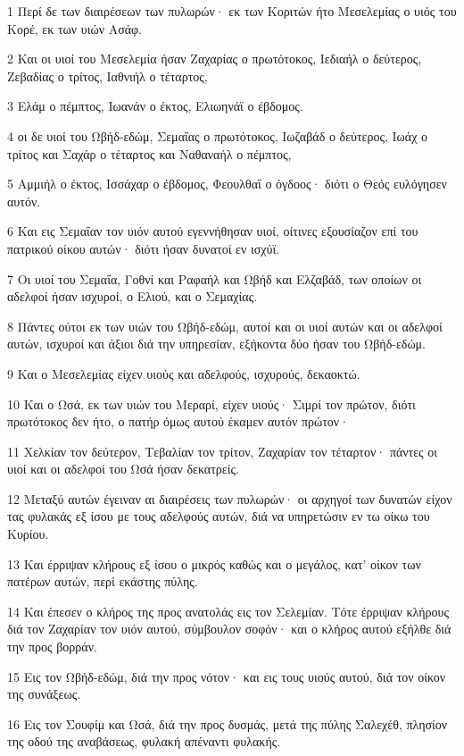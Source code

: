 \par 1 Περί δε των διαιρέσεων των πυλωρών· εκ των Κοριτών ήτο Μεσελεμίας ο υιός του Κορέ, εκ των υιών Ασάφ.
\par 2 Και οι υιοί του Μεσελεμία ήσαν Ζαχαρίας ο πρωτότοκος, Ιεδιαήλ ο δεύτερος, Ζεβαδίας ο τρίτος, Ιαθνιήλ ο τέταρτος,
\par 3 Ελάμ ο πέμπτος, Ιωανάν ο έκτος, Ελιωηνάϊ ο έβδομος.
\par 4 οι δε υιοί του Ωβήδ-εδώμ, Σεμαΐας ο πρωτότοκος, Ιωζαβάδ ο δεύτερος, Ιωάχ ο τρίτος και Σαχάρ ο τέταρτος και Ναθαναήλ ο πέμπτος,
\par 5 Αμμιήλ ο έκτος, Ισσάχαρ ο έβδομος, Φεουλθαΐ ο όγδοος· διότι ο Θεός ευλόγησεν αυτόν.
\par 6 Και εις Σεμαΐαν τον υιόν αυτού εγεννήθησαν υιοί, οίτινες εξουσίαζον επί του πατρικού οίκου αυτών· διότι ήσαν δυνατοί εν ισχύϊ.
\par 7 Οι υιοί του Σεμαΐα, Γοθνί και Ραφαήλ και Ωβήδ και Ελζαβάδ, των οποίων οι αδελφοί ήσαν ισχυροί, ο Ελιού, και ο Σεμαχίας.
\par 8 Πάντες ούτοι εκ των υιών του Ωβήδ-εδώμ, αυτοί και οι υιοί αυτών και οι αδελφοί αυτών, ισχυροί και άξιοι διά την υπηρεσίαν, εξήκοντα δύο ήσαν του Ωβήδ-εδώμ.
\par 9 Και ο Μεσελεμίας είχεν υιούς και αδελφούς, ισχυρούς, δεκαοκτώ.
\par 10 Και ο Ωσά, εκ των υιών του Μεραρί, είχεν υιούς· Σιμρί τον πρώτον, διότι πρωτότοκος δεν ήτο, ο πατήρ όμως αυτού έκαμεν αυτόν πρώτον·
\par 11 Χελκίαν τον δεύτερον, Τεβαλίαν τον τρίτον, Ζαχαρίαν τον τέταρτον· πάντες οι υιοί και οι αδελφοί του Ωσά ήσαν δεκατρείς.
\par 12 Μεταξύ αυτών έγειναν αι διαιρέσεις των πυλωρών· οι αρχηγοί των δυνατών είχον τας φυλακάς εξ ίσου με τους αδελφούς αυτών, διά να υπηρετώσιν εν τω οίκω του Κυρίου.
\par 13 Και έρριψαν κλήρους εξ ίσου ο μικρός καθώς και ο μεγάλος, κατ' οίκον των πατέρων αυτών, περί εκάστης πύλης.
\par 14 Και έπεσεν ο κλήρος της προς ανατολάς εις τον Σελεμίαν. Τότε έρριψαν κλήρους διά τον Ζαχαρίαν τον υιόν αυτού, σύμβουλον σοφόν· και ο κλήρος αυτού εξήλθε διά την προς βορράν.
\par 15 Εις τον Ωβήδ-εδώμ, διά την προς νότον· και εις τους υιούς αυτού, διά τον οίκον της συνάξεως.
\par 16 Εις τον Σουφίμ και Ωσά, διά την προς δυσμάς, μετά της πύλης Σαλεχέθ, πλησίον της οδού της αναβάσεως, φυλακή απέναντι φυλακής.

